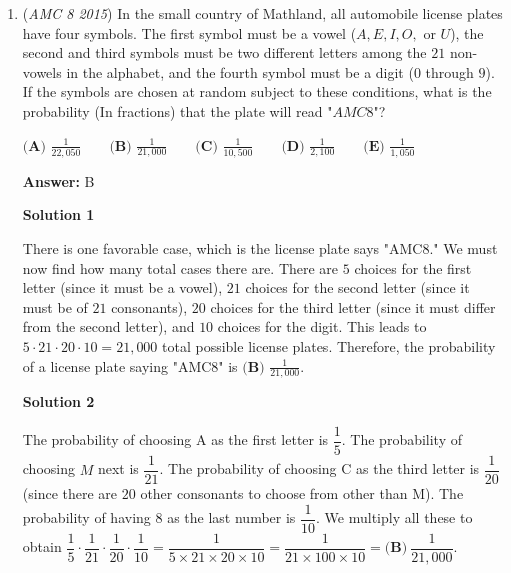 \begin{enumerate}
 
If you're too lazy to do $9 \times 9 \times 8 \times 7= 4536$, we can notice $9 \times 9 = 81$ and $8 \times 7=56$ The unit digit must be 6. Therefore, the answer is the only answer choice with a unit digit of 6, which is $\boxed{B}$.

 


	\item (\textit{AMC 8 2015}) In the small country of Mathland, all automobile license plates have four symbols. The first symbol must be a vowel ($A, E, I, O,$ or $U$), the second and third symbols must be two different letters among the $21$ non-vowels in the alphabet, and the fourth symbol must be a digit ($0$ through $9$). If the symbols are chosen at random subject to these conditions, what is the probability (In fractions) that the plate will read "$AMC8$"?


 $\textbf{(A) } \frac{1}{22,050} \qquad \textbf{(B) } \frac{1}{21,000}\qquad \textbf{(C) } \frac{1}{10,500}\qquad \textbf{(D) } \frac{1}{2,100} \qquad \textbf{(E) } \frac{1}{1,050}$

 \textbf{Answer: }B



\textbf{Solution 1}

There is one favorable case, which is the license plate says "AMC8."  We must now find how many total cases there are.  There are $5$ choices for the first letter (since it must be a vowel), $21$ choices for the second letter (since it must be of $21$ consonants), $20$ choices for the third letter (since it must differ from the second letter), and $10$ choices for the digit.  This leads to $5 \cdot 21 \cdot 20 \cdot 10=21,000$ total possible license plates.  Therefore, the probability of a license plate saying "AMC8" is $\boxed{\textbf{(B) } \frac{1}{21,000}}$.

 



\textbf{Solution 2}

The probability of choosing A as the first letter is $\dfrac{1}{5}$.  The probability of choosing $M$ next is $\dfrac{1}{21}$.  The probability of choosing C as the third letter is $\dfrac{1}{20}$ (since there are $20$ other consonants to choose from other than M). The probability of having $8$ as the last number is $\dfrac{1}{10}$.  We multiply all these to obtain $\dfrac{1}{5}\cdot \dfrac{1}{21} \cdot \dfrac{1}{20}\cdot \dfrac{1}{10}=\dfrac{1}{5\times 21\times 20\times 10}=\dfrac{1}{21\times 100\times 10}=\boxed{\textbf{(B)}~\dfrac{1}{21,000}}$.


\end{enumerate}
